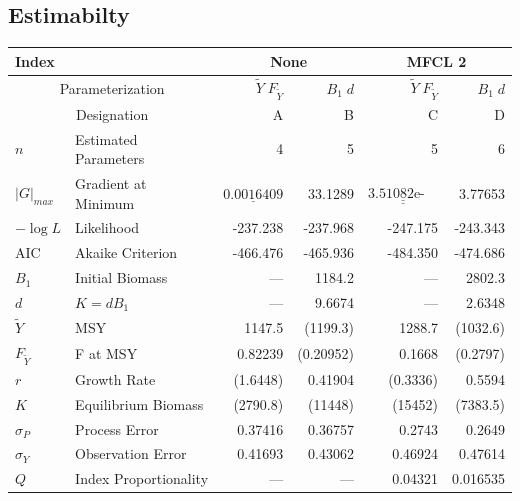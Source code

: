 \documentclass[letterpaper,KOMA,landscape,titlepage]{powersem}
\newcommand\MSY{\widetilde{Y}}
\newcommand\Fmsy{F_{\MSY}}
\newcommand\MSYFmsy{\MSY\;\Fmsy}
\newcommand\Bd{B_1\; d}
\begin{document}
\begin{slide}\section{Estimabilty}
{\scriptsize
\label{tag:ests4}
\begin{center}
\begin{tabular}{|ll|rr|rr|}
\hline
Index && \multicolumn{2}{c|}{None}&\multicolumn{2}{c|}{MFCL 2}\\
\hline
\multicolumn{2}{|c|}{Parameterization}&$\MSYFmsy$&$\Bd$&$\MSYFmsy$&$\Bd$\\
\multicolumn{2}{|c|}{Designation}& A & B& C& D\\
\hline
\hline
$n$ & Estimated Parameters &4 & 5 & 5 & 6\\
$|G|_{max}$& Gradient at Minimum & $\underline{\mbox{0.0016409}}$ & 33.1289 &
$\underline{\underline{\mbox{3.51082e-05}}}$ & 3.77653\\
$-\log L$& Likelihood & -237.238 & -237.968 & -247.175 & -243.343\\
AIC & Akaike Criterion & -466.476 & -465.936 & -484.350 & -474.686\\
\hline
$B_1$& Initial Biomass & --- & 1184.2 & --- & 2802.3\\
$d$ &$K=dB_1$ & --- & 9.6674 & --- & 2.6348\\
$\MSY$& MSY & 1147.5 & (1199.3) & 1288.7 & (1032.6)\\
$\Fmsy$& F at MSY & 0.82239 & (0.20952) & 0.1668 & (0.2797)\\
$r$& Growth Rate & (1.6448) & 0.41904 & (0.3336) & 0.5594\\
$K$& Equilibrium Biomass & (2790.8) & (11448) & (15452) & (7383.5)\\
$\sigma_P$& Process Error & 0.37416 & 0.36757 & 0.2743 & 0.2649\\
$\sigma_Y$& Observation Error & 0.41693 & 0.43062 & 0.46924 & 0.47614\\
$Q$& Index Proportionality  & --- & --- & 0.04321 & 0.016535\\
\hline
\end{tabular}
\end{center}
}
\end{slide}
\end{document}
